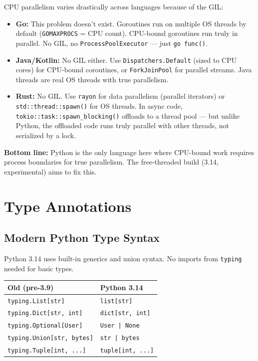 \documentclass[11pt,a4paper,oneside]{book}
\newcommand{\py}[1]{\texttt{\color{pyblue}#1}}
\newcommand{\rustcode}[1]{\texttt{\color{BrickRed}#1}}
\newcommand{\javacode}[1]{\texttt{\color{javaorange!80!black}#1}}
\begin{document}
\begin{analogybox}
CPU parallelism varies drastically across languages because of the GIL:
\begin{itemize}
    \item \textcolor{goblue}{\textbf{Go:}} This problem doesn't exist. Goroutines run on multiple
          OS threads by default (\texttt{GOMAXPROCS} = CPU count). CPU-bound goroutines run truly
          in parallel. No GIL, no \texttt{ProcessPoolExecutor} --- just \texttt{go func()}.
    \item \textcolor{javaorange}{\textbf{Java/Kotlin:}} No GIL either. Use
          \javacode{Dispatchers.Default} (sized to CPU cores) for CPU-bound coroutines, or
          \texttt{ForkJoinPool} for parallel streams. Java threads are real OS threads with
          true parallelism.
    \item \textcolor{BrickRed}{\textbf{Rust:}} No GIL. Use \texttt{rayon} for data parallelism
          (parallel iterators) or \rustcode{std::thread::spawn()} for OS threads. In async code,
          \rustcode{tokio::task::spawn\_blocking()} offloads to a thread pool --- but unlike Python,
          the offloaded code runs truly parallel with other threads, not serialized by a lock.
\end{itemize}
\vspace{4pt}
\textbf{Bottom line:} Python is the only language here where CPU-bound work requires process
boundaries for true parallelism. The free-threaded build (3.14, experimental) aims to fix this.
\end{analogybox}

\chapter{Type Annotations}

\section{Modern Python Type Syntax}

Python 3.14 uses built-in generics and union syntax. No imports from \py{typing} needed
for basic types.

\begin{migrationbox}
\begin{tabularx}{\textwidth}{lX}
\textbf{Old (pre-3.9)} & \textbf{Python 3.14} \\
\midrule
\py{typing.List[str]} & \py{list[str]} \\
\py{typing.Dict[str, int]} & \py{dict[str, int]} \\
\py{typing.Optional[User]} & \py{User | None} \\
\py{typing.Union[str, bytes]} & \py{str | bytes} \\
\py{typing.Tuple[int, ...]} & \py{tuple[int, ...]} \\
\end{tabularx}
\end{migrationbox}
\end{document}
